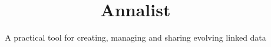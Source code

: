 \documentclass{sig-alternate-05-2015}
\begin{document}





%

\title{
  Annalist
  }
\subtitle{A practical tool for creating, managing and sharing evolving linked data}


%
%
%
%
%
\end{document}
